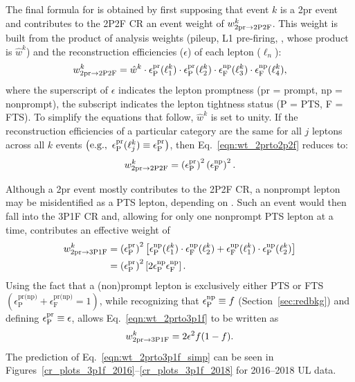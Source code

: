 The final formula for \nfourPRB is obtained by first supposing that event $k$ is a 2pr event and contributes to the 2P2F CR an event weight of $w_{\text{2pr} \to \text{2P2F}}^k$.
This weight is built from the product of analysis weights (pileup, L1 pre-firing, \etc, whose product is $\hat{w}^k$) and the reconstruction efficiencies ($\epsilon$) of each lepton ($\ell_n$):
\begin{equation}
	\label{eqn:wt_2prto2p2f}
	w_{\text{2pr} \to \text{2P2F}}^k = \hat{w}^k \cdot \epsilon^\text{pr}_\text{P}(\ell_1^k) \cdot \epsilon^\text{pr}_\text{P}(\ell_2^k) \cdot \epsilon^\text{np}_\text{F}(\ell_3^k) \cdot \epsilon^\text{np}_\text{F}(\ell_4^k),
\end{equation}
where the superscript of $\epsilon$ indicates the lepton promptness (pr = prompt, np = nonprompt),
the subscript indicates the lepton tightness status (P = PTS, F = FTS).
To simplify the equations that follow, $\hat{w}^k$ is set to unity.
If the reconstruction efficiencies of a particular category are the same for all $j$ leptons across all $k$ events $\left( \mbox{e.g.}, ~ \epsilon^\text{pr}_\text{P}(\ell_j^k) \equiv \epsilon^\text{pr}_\text{P} \right)$, then Eq.~\ref{eqn:wt_2prto2p2f} reduces to:
\begin{equation}
	\label{eqn:wt_2prto2p2f_simp}
	w_{\text{2pr} \to \text{2P2F}}^k = 
	\left( \epsilon^\text{pr}_\text{P} \right)^2 
	\left( \epsilon^\text{np}_\text{F} \right)^2.
\end{equation}

Although a 2pr event mostly contributes to the 2P2F CR, a nonprompt lepton may be misidentified as a PTS lepton, depending on \effnppass.
Such an event would then fall into the 3P1F CR and, allowing for only one nonprompt PTS lepton at a time, contributes an effective weight of
\begin{align}
	\label{eqn:wt_2prto3p1f}
	w_{\text{2pr} \to \text{3P1F}}^k
	&= \left( \epsilon^\text{pr}_\text{P} \right)^2 
	\left[
		\epsilon^\text{np}_\text{P}(\ell_1^k) \cdot \epsilon^\text{np}_\text{F}(\ell_2^k) + \epsilon^\text{np}_\text{F}(\ell_1^k) \cdot \epsilon^\text{np}_\text{P}(\ell_2^k)
	\right]
	\notag
	\\
	&= \left( \epsilon^\text{pr}_\text{P} \right)^2
	\left[
		2 \epsilon^\text{np}_\text{P} \epsilon^\text{np}_\text{F}
	\right].
\end{align}
Using the fact that a (non)prompt lepton is exclusively either PTS or FTS
$\left( \epsilon^\text{pr(np)}_\text{P} + \epsilon^\text{pr(np)}_\text{F} = 1 \right)$,
while recognizing that $\epsilon^\text{np}_\text{P} \equiv f$ (Section~\ref{sec:redbkg}) and defining $\epsilon^\text{pr}_\text{P} \equiv \epsilon$,
allows Eq.~\ref{eqn:wt_2prto3p1f} to be written as
\begin{equation}
	\label{eqn:wt_2prto3p1f_simp}
	w_{\text{2pr} \to \text{3P1F}}^k = 2 \epsilon^2 f (1-f).
\end{equation}
The prediction of Eq.~\ref{eqn:wt_2prto3p1f_simp} can be seen in Figures~\ref{cr_plots_3p1f_2016}--\ref{cr_plots_3p1f_2018} for 2016--2018 UL data.

